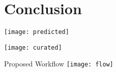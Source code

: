 \section{Conclusion}

\begin{frame}[c]{}
    \center
    \texttt{[image: predicted]}
\end{frame}

\begin{frame}[c]{}
    \center
    \texttt{[image: curated]}
\end{frame}

\begin{frame}[c]{Proposed Workflow}
    \center
    \texttt{[image: flow]}
\end{frame}

